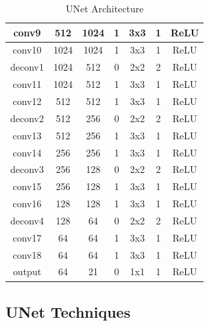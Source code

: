\begin{table}[H]
\begin{tabular}{|c|c|c|c|c|c|c|}
		conv9          & 512         & 1024         & 1                & 3x3             & 1               & ReLU                \\ \hline
		conv10         & 1024        & 1024         & 1                & 3x3             & 1               & ReLU                \\ \hline
		deconv1        & 1024        & 512          & 0                & 2x2             & 2               & ReLU                \\ \hline
		conv11         & 1024        & 512          & 1                & 3x3             & 1               & ReLU                \\ \hline
		conv12         & 512         & 512          & 1                & 3x3             & 1               & ReLU                \\ \hline
		deconv2        & 512         & 256          & 0                & 2x2             & 2               & ReLU                \\ \hline
		conv13         & 512         & 256          & 1                & 3x3             & 1               & ReLU                \\ \hline
		conv14         & 256         & 256          & 1                & 3x3             & 1               & ReLU                \\ \hline
		deconv3        & 256         & 128          & 0                & 2x2             & 2               & ReLU                \\ \hline
		conv15         & 256         & 128          & 1                & 3x3             & 1               & ReLU                \\ \hline
		conv16         & 128         & 128          & 1                & 3x3             & 1               & ReLU                \\ \hline
		deconv4        & 128         & 64           & 0                & 2x2             & 2               & ReLU                \\ \hline
		conv17         & 64          & 64           & 1                & 3x3             & 1               & ReLU                \\ \hline
		conv18         & 64          & 64           & 1                & 3x3             & 1               & ReLU                \\ \hline
		output         & 64          & 21           & 0                & 1x1             & 1               & ReLU                \\ \hline
	\end{tabular}
	\caption{UNet Architecture}
\end{table}

\subsection*{UNet Techniques}


